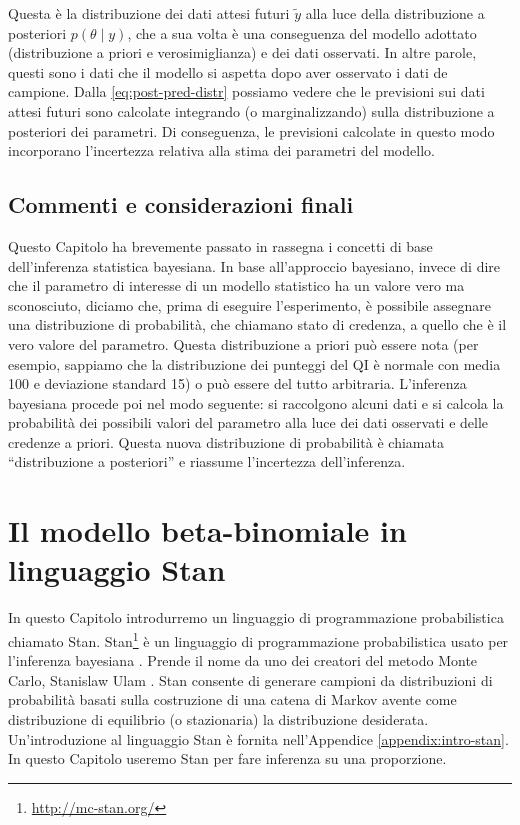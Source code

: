 \documentclass[
  11pt,
]{krantz}
\renewcommand{\href}[2]{#2\footnote{\url{#1}}}
\theoremstyle{definition}
\theoremstyle{definition}
\theoremstyle{definition}
\theoremstyle{definition}
\theoremstyle{remark}
\begin{document}
Questa è la distribuzione dei dati attesi futuri \(\tilde{y}\) alla luce della distribuzione a posteriori \(p(\theta \mid y)\), che a sua volta è una conseguenza del modello adottato (distribuzione a priori e verosimiglianza) e dei dati osservati. In altre parole, questi sono i dati che il modello si aspetta dopo aver osservato i dati de campione. Dalla \eqref{eq:post-pred-distr} possiamo vedere che le previsioni sui dati attesi futuri sono calcolate integrando (o marginalizzando) sulla distribuzione a posteriori dei parametri. Di conseguenza, le previsioni calcolate in questo modo incorporano l'incertezza relativa alla stima dei parametri del modello.

\hypertarget{commenti-e-considerazioni-finali}{%
\section*{Commenti e considerazioni finali}\label{commenti-e-considerazioni-finali}}


Questo Capitolo ha brevemente passato in rassegna i concetti di base dell'inferenza statistica bayesiana. In base all'approccio bayesiano, invece di dire che il parametro di interesse di un modello statistico ha un valore vero ma sconosciuto, diciamo che, prima di eseguire l'esperimento, è possibile assegnare una distribuzione di probabilità, che chiamano stato di credenza, a quello che è il vero valore del parametro. Questa distribuzione a priori può essere nota (per esempio, sappiamo che la distribuzione dei punteggi del QI è normale con media 100 e deviazione standard 15) o può essere del tutto arbitraria. L'inferenza bayesiana procede poi nel modo seguente: si raccolgono alcuni dati e si calcola la probabilità dei possibili valori del parametro alla luce dei dati osservati e delle credenze a priori. Questa nuova distribuzione di probabilità è chiamata ``distribuzione a posteriori'' e riassume l'incertezza dell'inferenza.

\hypertarget{stan-beta-binom}{%
\chapter{Il modello beta-binomiale in linguaggio Stan}\label{stan-beta-binom}}

In questo Capitolo introdurremo un linguaggio di programmazione probabilistica chiamato Stan. \href{http://mc-stan.org/}{Stan} è un linguaggio di programmazione probabilistica usato per l'inferenza bayesiana \citep{carpenter2017stan}. Prende il nome da uno dei creatori del metodo Monte Carlo, Stanislaw Ulam \citep{Eckhardt1987stan}. Stan consente di generare campioni da distribuzioni di probabilità basati sulla costruzione di una catena di Markov avente come distribuzione di equilibrio (o stazionaria) la distribuzione desiderata. Un'introduzione al linguaggio Stan è fornita nell'Appendice \ref{appendix:intro-stan}. In questo Capitolo useremo Stan per fare inferenza su una proporzione.
\end{document}
